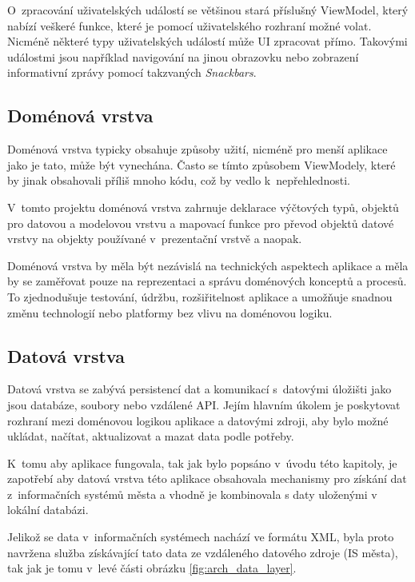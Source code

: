 O~zpracování uživatelských událostí se většinou stará příslušný ViewModel, který nabízí veškeré funkce, které je pomocí uživatelského rozhraní možné volat.
Nicméně některé typy uživatelských událostí může UI zpracovat přímo. Takovými událostmi jsou například navigování na jinou obrazovku nebo zobrazení 
informativní zprávy pomocí takzvaných \textit{Snackbars}.

\subsection*{Doménová vrstva}
Doménová vrstva typicky obsahuje způsoby užití, nicméně pro menší aplikace jako je tato, může být vynechána. Často se tímto způsobem  ViewModely,
které by jinak obsahovali příliš mnoho kódu, což by vedlo k~nepřehlednosti.

V~tomto projektu doménová vrstva zahrnuje deklarace výčtových typů, objektů pro datovou a modelovou vrstvu a mapovací funkce pro převod
objektů datové vrstvy na objekty používané v~prezentační vrstvě a naopak.

Doménová vrstva by měla být nezávislá na technických aspektech aplikace a měla by se zaměřovat pouze na reprezentaci a správu doménových
 konceptů a procesů. To zjednodušuje testování, údržbu, rozšiřitelnost aplikace a umožňuje snadnou změnu technologií nebo platformy bez 
 vlivu na doménovou logiku.

\subsection*{Datová vrstva}


Datová vrstva se zabývá persistencí dat a komunikací s~datovými úložišti jako jsou
databáze, soubory nebo vzdálené API. Jejím hlavním úkolem je poskytovat rozhraní mezi doménovou logikou aplikace a datovými zdroji, 
aby bylo možné ukládat, načítat, aktualizovat a mazat data podle potřeby.

K~tomu aby aplikace fungovala, tak jak bylo popsáno v~úvodu této kapitoly, je zapotřebí aby datová vrstva této aplikace obsahovala mechanismy pro
 získání dat z~informačních systémů města a vhodně je kombinovala s daty uloženými v lokální databázi.
 
Jelikož se data v~informačních systémech nachází ve formátu XML, byla proto navržena služba získávající tato data ze vzdáleného datového zdroje (IS města), tak jak je tomu v~levé části obrázku \ref{fig:arch_data_layer}. 

